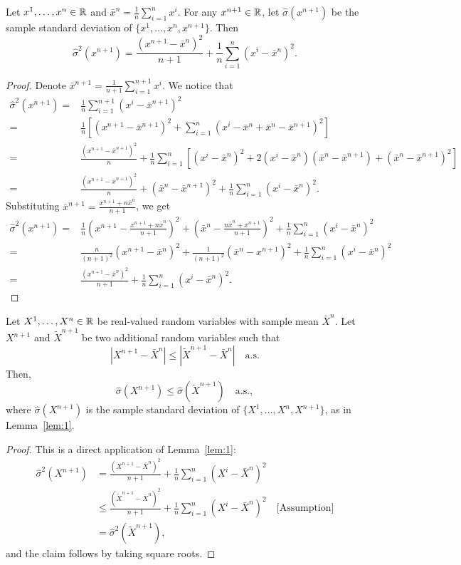 \begin{lemma}\label{lem:1}
    Let $x^1,\ldots,x^n \in \mathbb{R}$ and $\bar{x}^n = \frac{1}{n}\sum^n_{i=1}x^i$. For any $x^{n+1}\in \mathbb{R}$, let $\hat\sigma(x^{n+1})$ be the sample standard deviation of $\{x^1,\ldots,x^n, x^{n+1}\}$. Then
    \[
    \hat\sigma^2(x^{n+1}) = \frac{(x^{n+1}-\bar{x}^{n})^2}{n+1}+\frac{1}{n}\sum^n_{i=1}(x^i-\bar{x}^{n})^2.
    \]
\end{lemma}
\begin{proof}
    Denote $\bar{x}^{n+1} = \frac{1}{n+1}\sum^{n+1}_{i=1}x^i$. We notice that
\begin{align*}
    \hat\sigma^2(x^{n+1}) = &\frac{1}{n}\sum^{n+1}_{i=1}(x^i-\bar{x}^{n+1})^2\\
    = &\frac{1}{n} \left[ (x^{n+1}-\bar{x}^{n+1})^2+\sum^n_{i=1}(x^i-\bar{x}^{n}+\bar{x}^{n}-\bar{x}^{n+1})^2 \right]\\
    = &\frac{(x^{n+1}-\bar{x}^{n+1})^2}{n}+\frac{1}{n}\sum^n_{i=1}\left[(x^i-\bar{x}^{n})^2+2(x^i-\bar{x}^n)(\bar{x}^n-\bar{x}^{n+1})+(\bar{x}^{n}-\bar{x}^{n+1})^2\right]\\
    = &\frac{(x^{n+1}-\bar{x}^{n+1})^2}{n}+(\bar{x}^{n}-\bar{x}^{n+1})^2+\frac{1}{n}\sum^n_{i=1}(x^i-\bar{x}^{n})^2.
\end{align*}
Substituting $\bar{x}^{n+1} = \frac{x^{n+1}+n\bar{x}^n}{n+1}$, we get
\begin{align*}    
    \hat\sigma^2(x^{n+1}) = &\frac{1}{n}\left(x^{n+1}-\frac{x^{n+1}+n\bar{x}^n}{n+1}\right)^2+\left(\bar{x}^n-\frac{n\bar{x}^n+x^{n+1}}{n+1}\right)^2+\frac{1}{n}\sum^n_{i=1}(x^i-\bar{x}^{n})^2\\
    = &\frac{n}{(n+1)^2}(x^{n+1}-\bar{x}^n)^2+\frac{1}{(n+1)^2}(\bar{x}^n-x^{n+1})^2+\frac{1}{n}\sum^n_{i=1}(x^i-\bar{x}^{n})^2\\
    = &\frac{(x^{n+1}-\bar{x}^{n})^2}{n+1}+\frac{1}{n}\sum^n_{i=1}(x^i-\bar{x}^{n})^2.
\end{align*}
\end{proof}

\begin{lemma}\label{lem:2}
    Let $X^1,\ldots, X^n \in \mathbb{R}$ be real-valued random variables with sample mean $\bar{X}^n$. Let $X^{n+1}$ and $\tilde{X}^{n+1}$ be two additional random variables such that
    \[
    |X^{n+1} - \bar{X}^n| \leq |\tilde{X}^{n+1}-\bar{X}^n| \quad \text{a.s.}
    \]
    Then,
    \[
    \hat{\sigma}(X^{n+1}) \leq \hat{\sigma}(\tilde{X}^{n+1}) \quad \text{a.s.},
    \]
    where $\hat{\sigma}(X^{n+1})$ is the sample standard deviation of $\{X^1,\ldots,X^n, X^{n+1}\}$, as in Lemma~\ref{lem:1}.
\end{lemma}
\begin{proof}
    This is a direct application of Lemma~\ref{lem:1}:
\begin{align*}
    \hat{\sigma}^2(X^{n+1}) 
    &= \frac{(X^{n+1}-\bar{X}^{n})^2}{n+1}+\frac{1}{n}\sum^n_{i=1}(X^i-\bar{X}^{n})^2\\
    &\leq \frac{(\tilde{X}^{n+1}-\bar{X}^{n})^2}{n+1}+\frac{1}{n}\sum^n_{i=1}(X^i-\bar{X}^{n})^2 \quad \text{[Assumption]}\\
    &=\hat{\sigma}^2(\tilde{X}^{n+1}),
\end{align*}
and the claim follows by taking square roots.
\end{proof}


